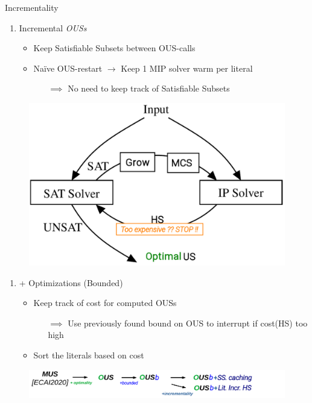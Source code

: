 \documentclass{beamer}
\begin{document}
	\begin{frame}{Incrementality}
	
	\begin{minipage}{0.59\textwidth}
		\begin{enumerate}
			\item {\color{vuborange} Incremental \emph{OUSs}}
			\begin{itemize}
				\item Keep Satisfiable Subsets between OUS-calls
				\item Naïve OUS-restart $\rightarrow$ Keep 1 MIP solver warm per literal
				\begin{itemize}
					\item[$\implies$] No need to keep track of Satisfiable Subsets
				\end{itemize}
			\end{itemize}	
		\end{enumerate}
	\end{minipage}
	\begin{minipage}{0.39\textwidth}
		\begin{figure}
			\includegraphics[width=\textwidth]{ihs_cost.png}
		\end{figure}
	\end{minipage}
	\begin{enumerate}
		\item {\color{vuborange} + Optimizations {\color{blue} (Bounded)}}
		\begin{itemize}
			\item Keep track of cost for computed OUSs 
			\begin{itemize}
				\item[$\implies$] Use previously found bound on OUS to interrupt if cost(HS) too high 
			\end{itemize}
			\item Sort the literals based on cost
		\end{itemize}
	\end{enumerate}
	
	\begin{figure}
		\includegraphics[width=\textwidth]{mus_to_ous_i_bounded.png}
	\end{figure}
\end{frame}
\end{document}
